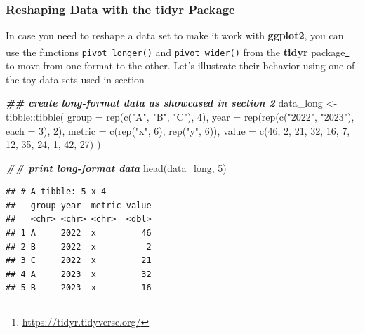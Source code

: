 \documentclass[
]{krantz}
\makeatletter
\newenvironment{Shaded}{\begin{snugshade}}{\end{snugshade}}
\newcommand{\AttributeTok}[1]{\textcolor[rgb]{0.61,0.61,0.61}{#1}}
\newcommand{\DecValTok}[1]{\textcolor[rgb]{0.06,0.06,0.06}{#1}}
\newcommand{\DocumentationTok}[1]{\textcolor[rgb]{0.37,0.37,0.37}{\textbf{\textit{#1}}}}
\newcommand{\FunctionTok}[1]{\textcolor[rgb]{0,0,0}{#1}}
\newcommand{\NormalTok}[1]{#1}
\newcommand{\OtherTok}[1]{\textcolor[rgb]{0.37,0.37,0.37}{#1}}
\newcommand{\SpecialCharTok}[1]{\textcolor[rgb]{0,0,0}{#1}}
\newcommand{\StringTok}[1]{\textcolor[rgb]{0.5,0.5,0.5}{#1}}
\renewcommand{\href}[2]{#2\footnote{\url{#1}}}
\newenvironment{kframe}{%
\medskip{}
\setlength{\fboxsep}{.8em}
 \def\at@end@of@kframe{}%
 \ifinner\ifhmode%
  \def\at@end@of@kframe{\end{minipage}}%
  \begin{minipage}{\columnwidth}%
 \fi\fi%
 \def\FrameCommand##1{\hskip\@totalleftmargin \hskip-\fboxsep
 \colorbox{shadecolor}{##1}\hskip-\fboxsep
     \hskip-\linewidth \hskip-\@totalleftmargin \hskip\columnwidth}%
 \MakeFramed {\advance\hsize-\width
   \@totalleftmargin\z@ \linewidth\hsize
   \@setminipage}}%
 {\par\unskip\endMakeFramed%
 \at@end@of@kframe}
\renewenvironment{Shaded}{\begin{kframe}}{\end{kframe}}
\makeatother
\begin{document}
\hypertarget{tidyr}{%
\subsubsection{\texorpdfstring{Reshaping Data with the \textbf{tidyr} Package}{Reshaping Data with the tidyr Package}}\label{tidyr}}

In case you need to reshape a data set to make it work with \textbf{ggplot2}, you can use the functions \texttt{pivot\_longer()} and \texttt{pivot\_wider()} from the \href{https://tidyr.tidyverse.org/}{\textbf{tidyr} package} \citep{tidyr} to move from one format to the other. Let's illustrate their behavior using one of the toy data sets used in section

\begin{Shaded}
\begin{Highlighting}[]
\DocumentationTok{\#\# create long{-}format data as showcased in section 2}
\NormalTok{data\_long }\OtherTok{\textless{}{-}}\NormalTok{ tibble}\SpecialCharTok{::}\FunctionTok{tibble}\NormalTok{(}
  \AttributeTok{group =} \FunctionTok{rep}\NormalTok{(}\FunctionTok{c}\NormalTok{(}\StringTok{"A"}\NormalTok{, }\StringTok{"B"}\NormalTok{, }\StringTok{"C"}\NormalTok{), }\DecValTok{4}\NormalTok{),}
  \AttributeTok{year =} \FunctionTok{rep}\NormalTok{(}\FunctionTok{rep}\NormalTok{(}\FunctionTok{c}\NormalTok{(}\StringTok{"2022"}\NormalTok{, }\StringTok{"2023"}\NormalTok{), }\AttributeTok{each =} \DecValTok{3}\NormalTok{), }\DecValTok{2}\NormalTok{),}
  \AttributeTok{metric =} \FunctionTok{c}\NormalTok{(}\FunctionTok{rep}\NormalTok{(}\StringTok{"x"}\NormalTok{, }\DecValTok{6}\NormalTok{), }\FunctionTok{rep}\NormalTok{(}\StringTok{"y"}\NormalTok{, }\DecValTok{6}\NormalTok{)),}
  \AttributeTok{value =} \FunctionTok{c}\NormalTok{(}\DecValTok{46}\NormalTok{, }\DecValTok{2}\NormalTok{, }\DecValTok{21}\NormalTok{, }\DecValTok{32}\NormalTok{, }\DecValTok{16}\NormalTok{, }\DecValTok{7}\NormalTok{, }\DecValTok{12}\NormalTok{, }\DecValTok{35}\NormalTok{, }\DecValTok{24}\NormalTok{, }\DecValTok{1}\NormalTok{, }\DecValTok{42}\NormalTok{, }\DecValTok{27}\NormalTok{)}
\NormalTok{)}

\DocumentationTok{\#\# print long{-}format data}
\FunctionTok{head}\NormalTok{(data\_long, }\DecValTok{5}\NormalTok{)}
\end{Highlighting}
\end{Shaded}

\begin{verbatim}
## # A tibble: 5 x 4
##   group year  metric value
##   <chr> <chr> <chr>  <dbl>
## 1 A     2022  x         46
## 2 B     2022  x          2
## 3 C     2022  x         21
## 4 A     2023  x         32
## 5 B     2023  x         16
\end{verbatim}
\end{document}
